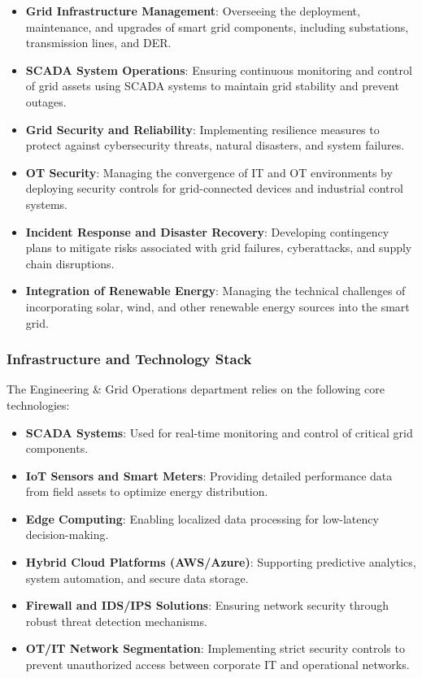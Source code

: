 \begin{itemize}
    \item \textbf{Grid Infrastructure Management}: Overseeing the deployment, maintenance, and upgrades of smart grid components, including substations, transmission lines, and \ac{DER}.
    \item \textbf{\ac{SCADA} System Operations}: Ensuring continuous monitoring and control of grid assets using \ac{SCADA} systems to maintain grid stability and prevent outages.
    \item \textbf{Grid Security and Reliability}: Implementing resilience measures to protect against cybersecurity threats, natural disasters, and system failures.
    \item \textbf{\ac{OT} Security}: Managing the convergence of \ac{IT} and \ac{OT} environments by deploying security controls for grid-connected devices and industrial control systems.
    \item \textbf{Incident Response and Disaster Recovery}: Developing contingency plans to mitigate risks associated with grid failures, cyberattacks, and supply chain disruptions.
    \item \textbf{Integration of Renewable Energy}: Managing the technical challenges of incorporating solar, wind, and other renewable energy sources into the smart grid.
\end{itemize}

\subsubsection{Infrastructure and Technology Stack}

The Engineering \& Grid Operations department relies on the following core technologies:

\begin{itemize}
    \item \textbf{\ac{SCADA} Systems}: Used for real-time monitoring and control of critical grid components.
    \item \textbf{\ac{IoT} Sensors and Smart Meters}: Providing detailed performance data from field assets to optimize energy distribution.
    \item \textbf{Edge Computing}: Enabling localized data processing for low-latency decision-making.
    \item \textbf{Hybrid Cloud Platforms (AWS/Azure)}: Supporting predictive analytics, system automation, and secure data storage.
    \item \textbf{Firewall and \ac{IDS}/\ac{IPS} Solutions}: Ensuring network security through robust threat detection mechanisms.
    \item \textbf{\ac{OT}/\ac{IT} Network Segmentation}: Implementing strict security controls to prevent unauthorized access between corporate \ac{IT} and operational networks.
\end{itemize}

